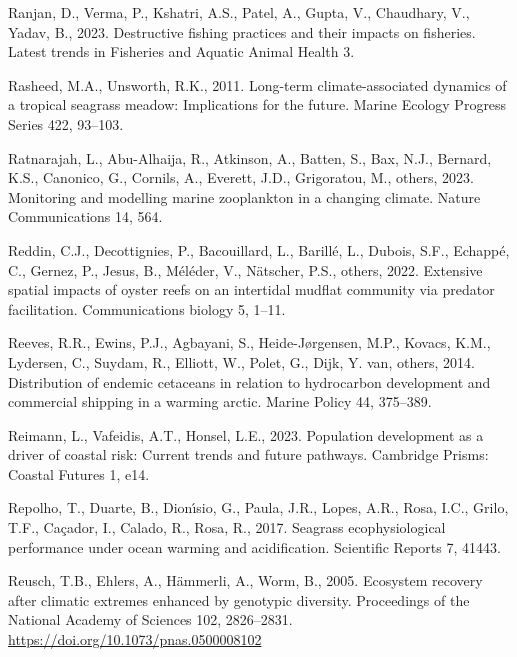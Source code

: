 \documentclass[
  letterpaper,
  11pt,
  english,
  singlespacing,
  headsepline]{MastersDoctoralThesis}
\newlength{\cslhangindent}
\newenvironment{CSLReferences}[2] %
 {\begin{list}{}{%
  \setlength{\itemindent}{0pt}
  \setlength{\leftmargin}{0pt}
  \setlength{\parsep}{0pt}
  \ifodd #1
   \setlength{\leftmargin}{\cslhangindent}
   \setlength{\itemindent}{-1\cslhangindent}
  \fi
  \setlength{\itemsep}{#2\baselineskip}}}
 {\end{list}}
\begin{document}
\begin{CSLReferences}{1}{0}
Ranjan, D., Verma, P., Kshatri, A.S., Patel, A., Gupta, V., Chaudhary,
V., Yadav, B., 2023. Destructive fishing practices and their impacts on
fisheries. Latest trends in Fisheries and Aquatic Animal Health 3.

Rasheed, M.A., Unsworth, R.K., 2011. Long-term climate-associated
dynamics of a tropical seagrass meadow: Implications for the future.
Marine Ecology Progress Series 422, 93--103.

Ratnarajah, L., Abu-Alhaija, R., Atkinson, A., Batten, S., Bax, N.J.,
Bernard, K.S., Canonico, G., Cornils, A., Everett, J.D., Grigoratou, M.,
others, 2023. Monitoring and modelling marine zooplankton in a changing
climate. Nature Communications 14, 564.

Reddin, C.J., Decottignies, P., Bacouillard, L., Barillé, L., Dubois,
S.F., Echappé, C., Gernez, P., Jesus, B., Méléder, V., Nätscher, P.S.,
others, 2022. Extensive spatial impacts of oyster reefs on an intertidal
mudflat community via predator facilitation. Communications biology 5,
1--11.

Reeves, R.R., Ewins, P.J., Agbayani, S., Heide-Jørgensen, M.P., Kovacs,
K.M., Lydersen, C., Suydam, R., Elliott, W., Polet, G., Dijk, Y. van,
others, 2014. Distribution of endemic cetaceans in relation to
hydrocarbon development and commercial shipping in a warming arctic.
Marine Policy 44, 375--389.

Reimann, L., Vafeidis, A.T., Honsel, L.E., 2023. Population development
as a driver of coastal risk: Current trends and future pathways.
Cambridge Prisms: Coastal Futures 1, e14.

Repolho, T., Duarte, B., Dionı́sio, G., Paula, J.R., Lopes, A.R., Rosa,
I.C., Grilo, T.F., Caçador, I., Calado, R., Rosa, R., 2017. Seagrass
ecophysiological performance under ocean warming and acidification.
Scientific Reports 7, 41443.

Reusch, T.B., Ehlers, A., Hämmerli, A., Worm, B., 2005. Ecosystem
recovery after climatic extremes enhanced by genotypic diversity.
Proceedings of the National Academy of Sciences 102, 2826--2831.
\url{https://doi.org/10.1073/pnas.0500008102}


\end{CSLReferences}
\end{document}
